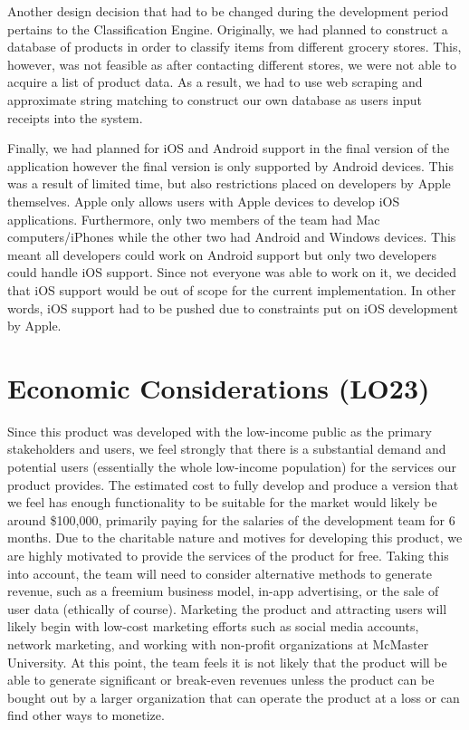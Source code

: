 \documentclass{article}
\begin{document}
Another design decision that had to be changed during the development period pertains to the Classification
Engine. Originally, we had planned to construct a database of products in order to classify items from different
grocery stores. This, however, was not feasible as after contacting different stores, we were not able to acquire
a list of product data. As a result, we had to use web scraping and approximate string matching to construct our own database
as users input receipts into the system.

Finally, we had planned for iOS and Android support in the final version of the application however the final version
is only supported by Android devices. This was a result of limited time, but also restrictions placed on developers
by Apple themselves. Apple only allows users with Apple devices to develop iOS applications. Furthermore, only two members of the
team had Mac computers/iPhones while the other two had Android and
Windows devices. This meant all developers could work on Android support but only two developers could handle iOS
support. Since not everyone was able to work on it, we decided that iOS support would be out of scope for the current
implementation. In other words, iOS support had to be pushed due to constraints put on iOS development by Apple.

\section{Economic Considerations (LO23)}

Since this product was developed with the low-income public as the primary stakeholders and users, we feel strongly that there is a substantial demand and potential users (essentially the whole low-income population) for the services our product provides. The estimated cost to fully develop and produce a version that we feel has enough functionality to be suitable for the market would likely be around \$100,000, primarily paying for the salaries of the development team for 6 months. Due to the charitable nature and motives for developing this product, we are highly motivated to provide the services of the product for free. Taking this into account, the team will need to consider alternative methods to generate revenue, such as a freemium business model, in-app advertising, or the sale of user data (ethically of course). Marketing the product and attracting users will likely begin with low-cost marketing efforts such as social media accounts, network marketing, and working with non-profit organizations at McMaster University. At this point, the team feels it is not likely that the product will be able to generate significant or break-even revenues unless the product can be bought out by a larger organization that can operate the product at a loss or can find other ways to monetize.
\end{document}
